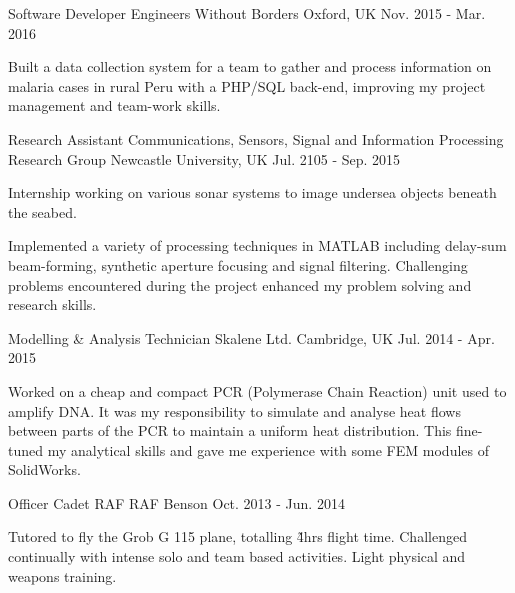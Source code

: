 \begin{cventries}
    \cventry
        {Software Developer}
        {Engineers Without Borders}
        {Oxford, UK}
        {Nov. 2015 - Mar. 2016}
        {
            \begin{cvitems}
                \item{Built a data collection system for a team to gather and process information on malaria cases in rural Peru with a PHP/SQL back-end, improving my project management and team-work skills.}
            \end{cvitems}
        }
        \vspace{-0.2cm}


    \cventry
        {Research Assistant}
        {Communications, Sensors, Signal and Information Processing Research Group}
        {Newcastle University, UK}
        {Jul. 2105 - Sep. 2015}
        {
            \begin{cvitems}
                \item{Internship working on various sonar systems to image undersea objects beneath the seabed.}
                \item{Implemented a variety of processing techniques in MATLAB including delay-sum beam-forming, synthetic aperture focusing and signal filtering. Challenging problems encountered during the project enhanced my problem solving and research skills.}
            \end{cvitems}
        }
        \vspace{-0.2cm}


    \cventry
        {Modelling \& Analysis Technician}
        {Skalene Ltd.}
        {Cambridge, UK}
        {Jul. 2014 - Apr. 2015}
        {
            \begin{cvitems}
                \item{Worked on a cheap and compact PCR (Polymerase Chain Reaction) unit used to amplify DNA. It was my responsibility to simulate and analyse heat flows between parts of the PCR to maintain a uniform heat distribution. This fine-tuned my analytical skills and gave me experience with some FEM modules of SolidWorks.}
            \end{cvitems}
        }
        \vspace{-0.2cm}


    \cventry
        {Officer Cadet}
        {RAF}
        {RAF Benson}
        {Oct. 2013 - Jun. 2014}
        {
            \begin{cvitems}
                \item{Tutored to fly the Grob G 115 plane, totalling \~4hrs flight time. Challenged continually with intense solo and team based activities. Light physical and weapons training.}
            \end{cvitems}
        }
        \vspace{-0.2cm}



\end{cventries}
